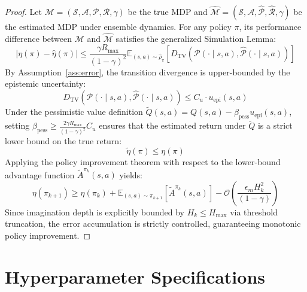 \documentclass[11pt,a4paper]{article}
\theoremstyle{definition}
\theoremstyle{remark}
\begin{document}
\begin{proof}
Let $\mathcal{M} = (\mathcal{S}, \mathcal{A}, \mathcal{P}, \mathcal{R}, \gamma)$ be the true MDP and $\hat{\mathcal{M}} = (\mathcal{S}, \mathcal{A}, \hat{\mathcal{P}}, \hat{\mathcal{R}}, \gamma)$ be the estimated MDP under ensemble dynamics. For any policy $\pi$, its performance difference between $\mathcal{M}$ and $\hat{\mathcal{M}}$ satisfies the generalized Simulation Lemma:
\begin{equation}
    |\eta(\pi) - \hat{\eta}(\pi)| \le \frac{\gamma R_{\max}}{(1 - \gamma)^2} \mathbb{E}_{(s, a) \sim \hat{\rho}_\pi} \left[ D_{\text{TV}}\left( \mathcal{P}(\cdot \mid s, a), \hat{\mathcal{P}}(\cdot \mid s, a) \right) \right]
\end{equation}
By Assumption~\ref{ass:error}, the transition divergence is upper-bounded by the epistemic uncertainty:
\begin{equation}
    D_{\text{TV}}\left( \mathcal{P}(\cdot \mid s, a), \hat{\mathcal{P}}(\cdot \mid s, a) \right) \le C_u \cdot u_{\text{epi}}(s, a)
\end{equation}
Under the pessimistic value definition $\tilde{Q}(s, a) = Q(s, a) - \beta_{\text{pess}} u_{\text{epi}}(s, a)$, setting $\beta_{\text{pess}} \ge \frac{2 \gamma R_{\max}}{(1 - \gamma)^2} C_u$ ensures that the estimated return under $\tilde{Q}$ is a strict lower bound on the true return:
\begin{equation}
    \tilde{\eta}(\pi) \le \eta(\pi)
\end{equation}
Applying the policy improvement theorem with respect to the lower-bound advantage function $\tilde{A}^{\pi_k}(s, a)$ yields:
\begin{equation}
    \eta(\pi_{k+1}) \ge \eta(\pi_k) + \mathbb{E}_{(s, a) \sim \pi_{k+1}} \left[ \tilde{A}^{\pi_k}(s, a) \right] - \mathcal{O}\left( \frac{\epsilon_m H_k^2}{(1 - \gamma)} \right)
\end{equation}
Since imagination depth is explicitly bounded by $H_k \le H_{\max}$ via threshold truncation, the error accumulation is strictly controlled, guaranteeing monotonic policy improvement.
\end{proof}

\section{Hyperparameter Specifications}
\label{app:hyperparameters}
\end{document}
